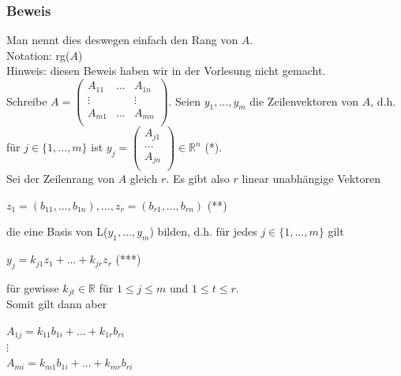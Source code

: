 \documentclass{article}
\begin{document}
\subsubsection*{Beweis}
Man nennt dies deswegen einfach den Rang von $A$. \\
Notation: rg($A$) \\
Hinweis: diesen Beweis haben wir in der Vorlesung nicht gemacht. \\
Schreibe $A = \begin{pmatrix}
    A_{11} & ... & A_{1n} \\
    \vdots &  & \vdots \\
    A_{m1} & ... & A_{mn} \\
\end{pmatrix}$. Seien $y_1,...,y_m$ die Zeilenvektoren von $A$, d.h. für $j \in \{1,...,m\}$ ist $y_j = \begin{pmatrix}
    A_{j1} \\
    ... \\
    A_{jn} \\
\end{pmatrix} \in \mathbb{R}^n$ (*). \\
Sei der Zeilenrang von $A$ gleich $r$. Es gibt also $r$ linear unabhängige Vektoren \\
\begin{center}
    $z_1 = (b_{11},...,b_{1n}), ..., z_r = (b_{r1},...,b_{rn})$ (**) \\
\end{center}
die eine Basis von L($y_1,...,y_m$) bilden, d.h. für jedes $j \in \{1,...,m\}$ gilt \\
\begin{center}
    $y_j = k_{j1} z_1 + ... + k_{jr} z_r$ (***) \\
\end{center}
für gewisse $k_{jt} \in \mathbb{R}$ für $1 \leq j \leq m$ und $1 \leq t \leq r$. \\
Somit gilt dann aber \\
\begin{center}
    $A_{1j} = k_{11} b_{1i} + ... + k_{1r} b_{ri}$ \\
    $\vdots$ \\
    $A_{mi} = k_{m1} b_{1i} + ... + k_{mr} b_{ri}$ \\
\end{center}
\end{document}
